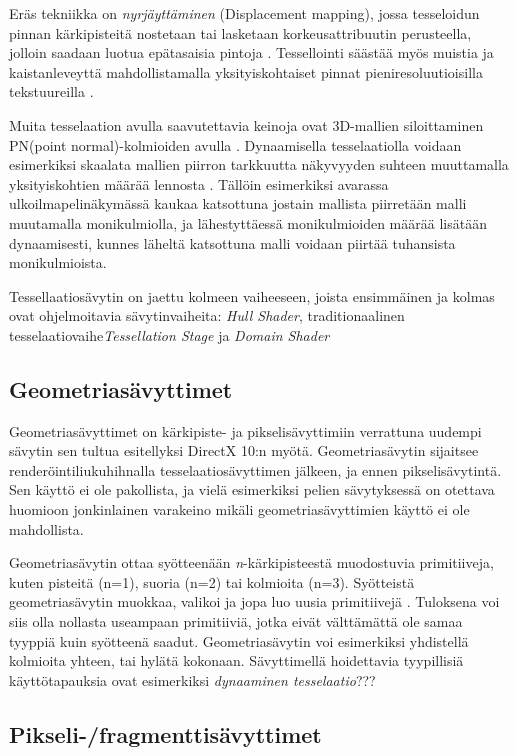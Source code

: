\documentclass[finnish]{tktltiki2}
\theoremstyle{definition}
\theoremstyle{remark}
\begin{document}
Eräs tekniikka on \emph{nyrjäyttäminen} (Displacement mapping), jossa tesseloidun pinnan kärkipisteitä nostetaan tai lasketaan korkeusattribuutin perusteella, jolloin saadaan luotua epätasaisia pintoja \cite{Nvi10}. Tessellointi säästää myös muistia ja kaistanleveyttä mahdollistamalla yksityiskohtaiset pinnat pieniresoluutioisilla tekstuureilla \cite{Mic11} \cite{Nvi10}.

Muita tesselaation avulla saavutettavia keinoja ovat 3D-mallien siloittaminen PN(point normal)-kolmioiden avulla \cite{Vla01}. Dynaamisella tesselaatiolla voidaan esimerkiksi skaalata mallien piirron tarkkuutta näkyvyyden suhteen muuttamalla yksityiskohtien määrää lennosta \cite{Nvi10}. Tällöin esimerkiksi avarassa ulkoilmapelinäkymässä kaukaa katsottuna jostain mallista piirretään malli muutamalla monikulmiolla, ja lähestyttäessä monikulmioiden määrää lisätään dynaamisesti, kunnes läheltä katsottuna malli voidaan piirtää tuhansista monikulmioista.

Tessellaatiosävytin on jaettu kolmeen vaiheeseen, joista ensimmäinen ja kolmas ovat ohjelmoitavia sävytinvaiheita: \emph{Hull Shader}, traditionaalinen tesselaatiovaihe\emph{Tessellation Stage} ja \emph{Domain Shader}   \cite{Mic11}

\subsection{Geometriasävyttimet}

Geometriasävyttimet on kärkipiste- ja pikselisävyttimiin verrattuna uudempi sävytin sen tultua esitellyksi DirectX 10:n myötä. Geometriasävytin sijaitsee renderöintiliukuhihnalla tesselaatiosävyttimen jälkeen, ja ennen pikselisävytintä. Sen käyttö ei ole pakollista, ja vielä esimerkiksi pelien sävytyksessä on otettava huomioon jonkinlainen varakeino mikäli geometriasävyttimien käyttö ei ole mahdollista.

Geometriasävytin ottaa syötteenään \emph{n}-kärkipisteestä muodostuvia primitiiveja, kuten pisteitä (n=1), suoria (n=2) tai kolmioita (n=3). Syötteistä geometriasävytin muokkaa, valikoi ja jopa luo uusia primitiivejä \cite{Gre14}. Tuloksena voi siis olla nollasta useampaan primitiiviä, jotka eivät välttämättä ole samaa tyyppiä kuin syötteenä saadut. Geometriasävytin voi esimerkiksi yhdistellä kolmioita yhteen, tai hylätä kokonaan. Sävyttimellä hoidettavia tyypillisiä käyttötapauksia ovat esimerkiksi \emph{dynaaminen tesselaatio}??? 

\subsection{Pikseli-/fragmenttisävyttimet}
\end{document}
